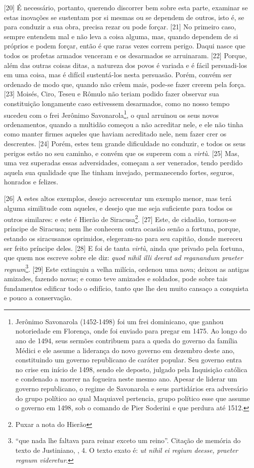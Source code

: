 {[}20{]} É necessário, portanto, querendo discorrer bem sobre esta
parte, examinar se estas inovações se sustentam por si mesmas ou se
dependem de outros, isto é, se para conduzir a sua obra, precisa rezar
ou pode forçar. {[}21{]} No primeiro caso, sempre entendem mal e não
leva a coisa alguma, mas, quando dependem de si próprios e podem forçar,
então é que raras vezes correm perigo. Daqui nasce que todos os profetas
armados venceram e os desarmados se arruinaram. {[}22{]} Porque, além
das outras coisas ditas, a natureza dos povos é variada e é fácil
persuadi-los em uma coisa, mas é difícil sustentá-los nesta persuasão.
Porém, convém ser ordenado de modo que, quando não crêem mais, pode-se
fazer crerem pela força. {[}23{]} Moisés, Ciro, Teseu e Rômulo não
teriam podido fazer observar sua constituição longamente caso estivessem
desarmados, como no nosso tempo sucedeu com o frei Jerônimo
Savonarola\footnote{Jerônimo Savonarola (1452-1498) foi um frei
  dominicano, que ganhou notoriedade em Florença, onde foi enviado para
  pregar em 1475. Ao longo do ano de 1494, seus sermões contribuem para
  a queda do governo da família Médici e ele assume a liderança do novo
  governo em dezembro deste ano, constituindo um governo republicano de
  caráter popular. Seu governo entra no crise em início de 1498, sendo
  ele deposto, julgado pela Inquisição católica e condenado a morrer na
  fogueira neste mesmo ano. Apesar de liderar um governo republicano, o
  regime de Savonarola e seus partidários era adversário do grupo
  político ao qual Maquiavel pertencia, grupo político esse que assume o
  governo em 1498, sob o comando de Pier Soderini e que perdura até
  1512.}, o qual arruinou os seus novos ordenamentos, quando a multidão
começou a não acreditar nele, e ele não tinha como manter firmes aqueles
que haviam acreditado nele, nem fazer crer os descrentes. {[}24{]}
Porém, estes tem grande dificuldade no conduzir, e todos os seus perigos
estão no seu caminho, e convém que os superem com a \emph{virtù}.
{[}25{]} Mas, uma vez superadas essas adversidades, começam a ser
venerados, tendo perdido aquela sua qualidade que lhe tinham invejado,
permanecendo fortes, seguros, honrados e felizes.

{[}26{]} A estes altos exemplos, desejo acrescentar um exemplo menor,
mas terá alguma similitude com aqueles, e desejo que me seja suficiente
para todos os outros similares: e este é Hierão de Siracusa\footnote{Puxar
  a nota do Hierão}. {[}27{]} Este, de cidadão, tornou-se príncipe de
Siracusa; nem lhe conhecem outra ocasião senão a fortuna, porque,
estando os siracusanos oprimidos, elegeram-no para seu capitão, donde
mereceu ser feito príncipe deles. {[}28{]} E foi de tanta \emph{virtù},
ainda que privado pela fortuna, que quem nos escreve sobre ele diz:
\emph{quod nihil illi deerat ad reganandum praeter regnum}\footnote{``que
  nada lhe faltava para reinar exceto um reino''. Citação de memória do
  texto de Justiniano, , 4. O texto exato é: \emph{ut nihil ei
  regium deesse, praeter regnum videretur}.}. {[}29{]} Este extinguiu a
velha milícia, ordenou uma nova; deixou as antigas amizades, fazendo
novas; e como teve amizades e soldados, pode sobre tais fundamentos
edificar todo o edifício, tanto que lhe deu muito cansaço a conquista e
pouco a conservação.

